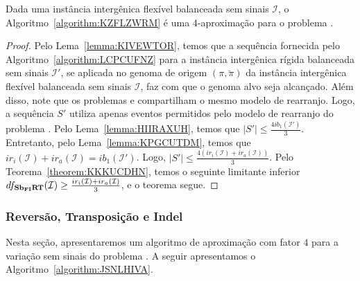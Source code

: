 \begin{theorem}\label{theorem:DSCDQRUP}
Dada uma instância intergênica flexível balanceada sem sinais $\mathcal{I}$, o Algoritmo~\ref{algorithm:KZFLZWRM} é uma $4$-aproximação para o problema \SbFIRT{}.
\end{theorem}
\begin{proof}
Pelo Lema~\ref{lemma:KIVEWTOR}, temos que a sequência fornecida pelo Algoritmo~\ref{algorithm:LCPCUFNZ} para a instância intergênica rígida balanceada sem sinais $\mathcal{I'}$, se aplicada no genoma de origem $(\pi,\breve\pi)$ da instância intergênica flexível balanceada sem sinais $\mathcal{I}$, faz com que o genoma alvo seja alcançado. Além disso, note que os problemas \SbIRT{} e \SbFIRT{} compartilham o mesmo modelo de rearranjo. Logo, a sequência $S'$ utiliza apenas eventos permitidos pelo modelo de rearranjo do problema \SbFIRT{}. Pelo Lema~\ref{lemma:HIIRAXUH}, temos que $|S'| \le \frac{4ib_1(\mathcal{I}')}{3}$. Entretanto, pelo Lema~\ref{lemma:KPGCUTDM}, temos que $ir_i(\mathcal{I}) + ir_a(\mathcal{I}) = ib_1(\mathcal{I'})$. Logo, $|S'| \le \frac{4(ir_i(\mathcal{I}) + ir_a(\mathcal{I}))}{3}$. Pelo Teorema~\ref{theorem:KKKUCDHN}, temos o seguinte limitante inferior $df_{\textbf{Sb\textsubscript{FI}RT}}(\mathcal{I}) \ge \frac{ir_i(\mathcal{I}) + ir_a(\mathcal{I})}{3}$, e o teorema segue.
\end{proof}

\subsubsection{Reversão, Transposição e Indel}

Nesta seção, apresentaremos um algoritmo de aproximação com fator $4$ para a variação sem sinais do problema \SbFIRTI{}. A seguir apresentamos o Algoritmo~\ref{algorithm:JSNLHIVA}.



